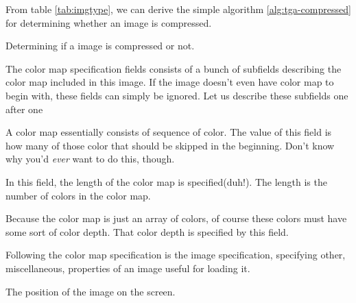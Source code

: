 \begin{refsection}
  From table \ref{tab:imgtype}, we can derive the simple algorithm
  \ref{alg:tga-compressed} for determining whether an image is
  compressed.

  \begin{algorithm}[H]
    \caption{Determining if a \tga image is compressed or not.}
    \label{alg:tga-compressed}
    \begin{algorithmic}[1]
    \end{algorithmic}
  \end{algorithm}


  The color map specification fields consists of a bunch of subfields
  describing the color map included in this image. If the image
  doesn't even have color map to begin with, these fields can simply
  be ignored. Let us describe these subfields one after one


  A color map essentially consists of sequence of color. The value of
  this field is how many of those color that should be skipped in the
  beginning. Don't know why you'd \textit{ever} want to do this, though.


  In this field, the length of the color map is specified(duh!). The
  length is the number of colors in the color map.


  Because the color map is just an array of colors, of course these
  colors must have some sort of color depth. That color depth is
  specified by this field.


  Following the color map specification is the image specification,
  specifying other, miscellaneous, properties of an image useful for
  loading it.



  The position of the image on the screen.



\end{refsection}
